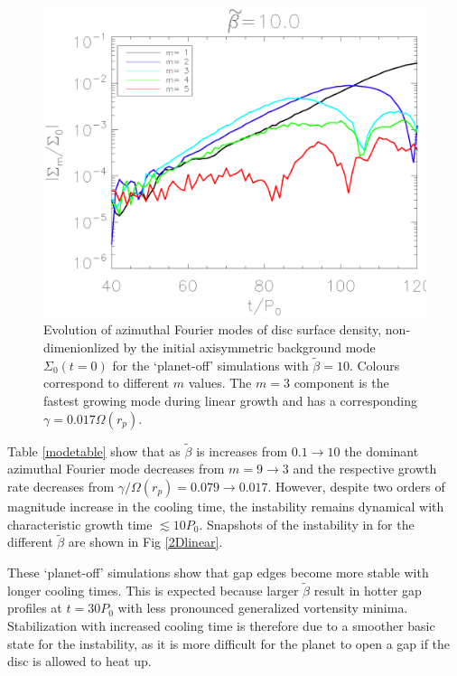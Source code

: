 \begin{figure}
  \includegraphics[width=\linewidth,clip=true,trim=1.2cm
  0cm 0cm 0cm]{figures/linear_stability}
  \caption{Evolution of azimuthal Fourier modes of disc surface
    density, non-dimenionlized by the initial axisymmetric background mode 
    $\Sigma_0(t=0)$ for the
    `planet-off' simulations with $\tilde{\beta}=10$. Colours correspond
    to different $m$ values. The $m=3$ component is the fastest growing
    mode during linear growth and has a corresponding
    $\gamma=0.017\Omega(r_p)$.\label{linearmodes}}
\end{figure}


Table \ref{modetable} show that as
$\tilde{\beta}$ is increases from $ 0.1\rightarrow10$ the dominant
azimuthal Fourier mode decreases from $ m=9\rightarrow3$ and the
respective growth rate decreases from $ \gamma/\Omega(r_p)=0.079
\rightarrow 0.017$. However, despite two orders of magnitude increase in the
cooling time, the instability remains dynamical with characteristic  growth time
$\lesssim 10P_0$. Snapshots of the instability in for  
the different $\tilde\beta$ are shown in Fig \ref{2Dlinear}. 

These `planet-off' simulations show that gap edges become more stable with
longer cooling times. This is expected because larger $\tilde{\beta}$
result in hotter gap profiles at $t=30P_0$ with less pronounced
generalized vortensity minima. Stabilization with increased
cooling time is therefore due to a smoother basic state for the
instability, as it is more difficult for the planet to open a gap if
the disc is allowed to heat up. 

